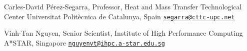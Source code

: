 \documentclass[line]{res}
\newenvironment{p1}
  {\begin{adjustwidth}{-16pt}{0pt}
  \vspace{1pt}}
  {\end{adjustwidth}}
\begin{document}
\begin{resume}
\begin{p1}
Carles-David P\'{e}rez-Segarra, Professor, Heat and Mass Transfer Technological Center\newline
Universitat Polit\`{e}cnica de Catalunya, Spain\newline
\href{mailto:segarra@cttc-upc.net}{\texttt{segarra@cttc-upc.net}}

Vinh-Tan Nguyen, Senior Scientist, Institute of High Performance Computing\newline
A*STAR, Singapore\newline
\href{mailto:nguyenvt@ihpc.a-star.edu.sg}{\texttt{nguyenvt@ihpc.a-star.edu.sg}}
\end{p1}
\end{resume}
\end{document}
